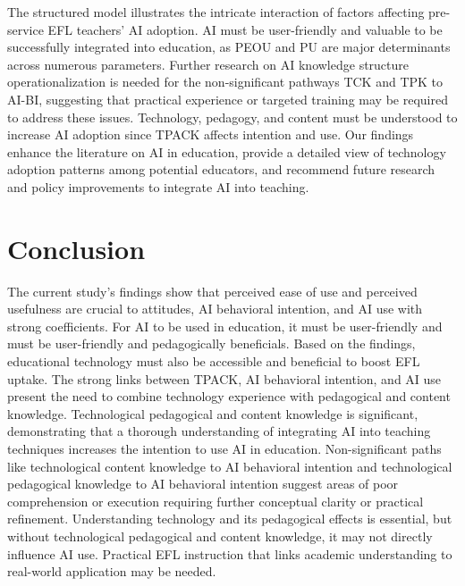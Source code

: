 \documentclass[english]{textolivre}
\begin{document}
The structured model illustrates the intricate interaction of factors affecting pre-service EFL teachers’ AI adoption. AI must be user-friendly and valuable to be successfully integrated into education, as PEOU and PU are major determinants across numerous parameters. Further research on AI knowledge structure operationalization is needed for the non-significant pathways TCK and TPK to AI-BI, suggesting that practical experience or targeted training may be required to address these issues. Technology, pedagogy, and content must be understood to increase AI adoption since TPACK affects intention and use. Our findings enhance the literature on AI in education, provide a detailed view of technology adoption patterns among potential educators, and recommend future research and policy improvements to integrate AI into teaching.

\section{Conclusion}
The current study's findings show that perceived ease of use and perceived usefulness are crucial to attitudes, AI behavioral intention, and AI use with strong coefficients. For AI to be used in education, it must be user-friendly and must be user-friendly and pedagogically beneficials. Based on the findings, educational technology must also be accessible and beneficial to boost EFL uptake. The strong links between TPACK, AI behavioral intention, and AI use present the need to combine technology experience with pedagogical and content knowledge. Technological pedagogical and content knowledge is significant, demonstrating that a thorough understanding of integrating AI into teaching techniques increases the intention to use AI in education. Non-significant paths like technological content knowledge to AI behavioral intention and technological pedagogical knowledge to AI behavioral intention suggest areas of poor comprehension or execution requiring further conceptual clarity or practical refinement. Understanding technology and its pedagogical effects is essential, but without technological pedagogical and content knowledge, it may not directly influence AI use. Practical EFL instruction that links academic understanding to real-world application may be needed. 
\end{document}
